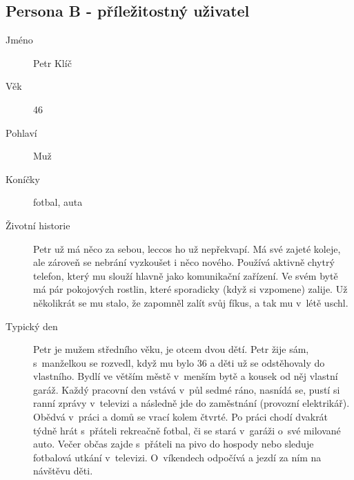 \documentclass[thesis=M,czech]{FITthesis}[2019/12/23]
\begin{document}
\subsection{Persona B - příležitostný uživatel}
\begin{description}
    \item[Jméno] Petr Klíč
    \item[Věk] 46
    \item[Pohlaví] Muž
    \item[Koníčky] fotbal, auta
    \item[Životní historie] Petr už má něco za sebou, leccos ho už nepřekvapí. Má své zajeté koleje, ale zároveň se nebrání vyzkoušet i něco nového. Používá aktivně chytrý telefon, který mu slouží hlavně jako komunikační zařízení. Ve svém bytě má pár pokojových rostlin, které sporadicky (když si vzpomene) zalije. Už několikrát se mu stalo, že zapomněl zalít svůj fíkus, a tak mu v~létě uschl.
    \item[Typický den] Petr je mužem středního věku, je otcem dvou dětí. Petr žije sám, s~manželkou se rozvedl, když mu bylo 36 a děti už se odstěhovaly do vlastního. Bydlí ve větším městě v~menším bytě a kousek od něj vlastní garáž. Každý pracovní den vstává v~půl sedmé ráno, nasnídá se, pustí si ranní zprávy v~televizi a následně jde do zaměstnání (provozní elektrikář). Obědvá v~práci a domů se vrací kolem čtvrté. Po práci chodí dvakrát týdně hrát s~přáteli rekreačně fotbal, či se stará v~garáži o~své milované auto. Večer občas zajde s~přáteli na pivo do hospody nebo sleduje fotbalová utkání v~televizi. O~víkendech odpočívá a jezdí za ním na návštěvu děti.
\end{description}
\end{document}
